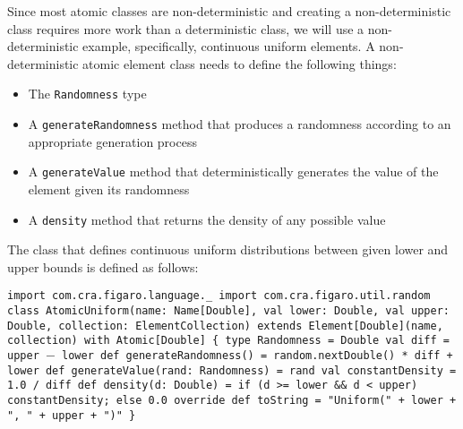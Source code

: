 Since most atomic classes are non-deterministic and creating a non-deterministic class requires more work than a deterministic class, we will use a non-deterministic example, specifically, continuous uniform elements. A non-deterministic atomic element class needs to define the following things:

\begin{itemize}
\item The \texttt{Randomness} type
\item A \texttt{generateRandomness} method that produces a randomness according to an appropriate generation process
\item A \texttt{generateValue} method that deterministically generates the value of the element given its randomness
\item A \texttt{density} method that returns the density of any possible value
\end{itemize}

The class that defines continuous uniform distributions between given lower and upper bounds is defined as follows:

\begin{flushleft}
\texttt{import com.cra.figaro.language.\_
\newline import com.cra.figaro.util.random
\newline 
\newline class AtomicUniform(name: Name[Double], val lower: Double, val upper: Double, collection: ElementCollection)
\newline extends Element[Double](name, collection) with
Atomic[Double] \{
\newline \tab type Randomness = Double val diff = upper $-$ lower
\newline 
\newline \tab def generateRandomness() = random.nextDouble() * diff + lower def \newline 
\newline \tab generateValue(rand: Randomness) = rand
\newline 
\newline \tab val constantDensity = 1.0 / diff
\newline 
\newline \tab def density(d: Double) = if (d >= lower \&\& d < upper)
\newline \tab constantDensity; else 0.0
\newline 
\newline \tab override def toString = "Uniform(" + lower + ", " + upper + ")"
\newline \}
}
\end{flushleft}

